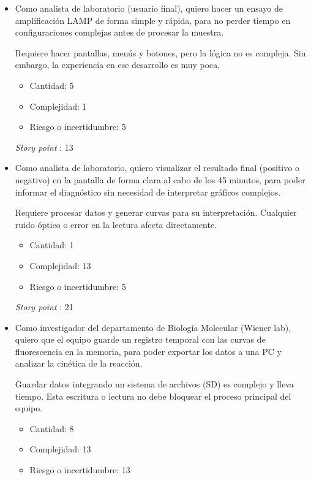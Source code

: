 \documentclass[
11pt, %
]{charter}
\begin{document}
\begin{itemize}
    \item Como analista de laboratorio (usuario final), quiero hacer un ensayo de amplificación LAMP de forma simple y rápida, para no perder tiempo en configuraciones complejas antes de procesar la muestra.
    
    Requiere hacer pantallas, menús y botones, pero la lógica no es compleja. Sin embargo, la experiencia en ese desarrollo es muy poca.
    \begin{itemize}
    	
    	\item Cantidad: 5 
    	\item Complejidad: 1
    	\item Riesgo o incertidumbre: 5
	\end{itemize}

\begin{center}
\textit{Story point} : 13
\end{center} 
    
    \item Como analista de laboratorio, quiero visualizar el resultado final (positivo o negativo) en la pantalla de forma clara al cabo de los 45 minutos, para poder informar el diagnóstico sin necesidad de interpretar gráficos complejos.
    
     Requiere procesar datos y generar curvas para su interpretación. Cualquier ruido óptico o error en la lectura afecta directamente.
	\begin{itemize}
    	\item Cantidad: 1 
    	\item Complejidad: 13
    	\item Riesgo o incertidumbre: 5
	\end{itemize}

\begin{center}
\textit{Story point} : 21
\end{center}
    
    \item Como investigador del departamento de Biología Molecular (Wiener lab), quiero que el equipo guarde un registro temporal con las curvas de fluorescencia en la memoria, para poder exportar los datos a una PC y analizar la cinética de la reacción.
    
    Guardar datos integrando un sistema de archivos (SD) es complejo y lleva tiempo. Esta escritura o lectura no debe bloquear el proceso principal del equipo.
    \begin{itemize}
    	\item Cantidad: 8
    	\item Complejidad: 13
    	\item Riesgo o incertidumbre: 13
	\end{itemize}


\end{itemize}
\end{document}
